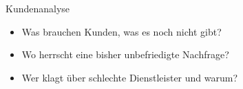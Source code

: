
\begin{frame}{Kundenanalyse}
  \begin{itemize}
  \item Was brauchen Kunden, was es noch nicht gibt?
  \item Wo herrscht eine bisher unbefriedigte Nachfrage?
  \item Wer klagt über schlechte Dienstleister und warum?
  \end{itemize}
\end{frame}

